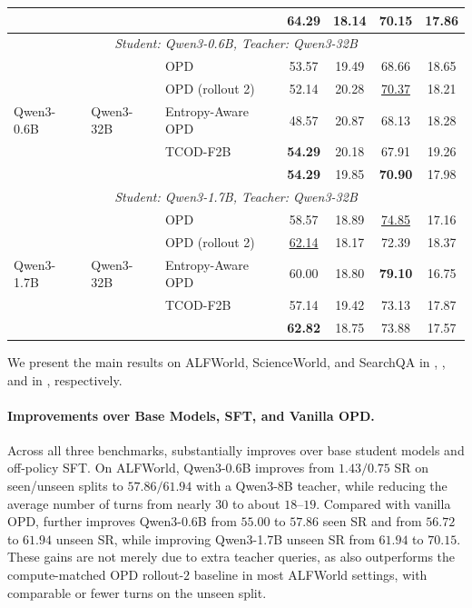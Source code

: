 \begin{table}[t]
{\begin{tabular}{lllcccc}
 & & \ours{} & \textbf{64.29} & 18.14 & \textbf{70.15} & 17.86 \\
\midrule
\multicolumn{7}{c}{\textit{Student: Qwen3-0.6B, Teacher: Qwen3-32B}} \\
\midrule
\multirow{5}{*}{Qwen3-0.6B} & \multirow{5}{*}{Qwen3-32B} & OPD & 53.57 & 19.49 & 68.66 & 18.65 \\
 & & OPD (rollout 2) & 52.14 & 20.28 & \underline{70.37} & 18.21 \\
 & & Entropy-Aware OPD & 48.57 & 20.87 & 68.13 & 18.28 \\
 & & TCOD-F2B & \textbf{54.29} & 20.18 & 67.91 & 19.26 \\
 & & \ours{} & \textbf{54.29} & 19.85 & \textbf{70.90} & 17.98 \\
\midrule
\multicolumn{7}{c}{\textit{Student: Qwen3-1.7B, Teacher: Qwen3-32B}} \\
\midrule
\multirow{5}{*}{Qwen3-1.7B} & \multirow{5}{*}{Qwen3-32B} & OPD & 58.57 & 18.89 & \underline{74.85} & 17.16 \\
 & & OPD (rollout 2) & \underline{62.14} & 18.17 & 72.39 & 18.37 \\
 & & Entropy-Aware OPD & 60.00 & 18.80 & \textbf{79.10} & 16.75 \\
 & & TCOD-F2B & 57.14 & 19.42 & 73.13 & 17.87 \\
 & & \ours{} & \textbf{62.82} & 18.75 & 73.88 & 17.57 \\
\bottomrule
\end{tabular}%
}
\end{table}

We present the main results on ALFWorld, ScienceWorld, and SearchQA in , , and  in , respectively.

\paragraph{Improvements over Base Models, SFT, and Vanilla OPD.}
Across all three benchmarks, \ours{} substantially improves over base student models and off-policy SFT. 
%
On ALFWorld, Qwen3-0.6B improves from $1.43/0.75$ SR on seen/unseen splits to $57.86/61.94$ with a Qwen3-8B teacher, while reducing the average number of turns from nearly $30$ to about $18$--$19$. 
%
Compared with vanilla OPD, \ours{} further improves Qwen3-0.6B from $55.00$ to $57.86$ seen SR and from $56.72$ to $61.94$ unseen SR, while improving Qwen3-1.7B unseen SR from $61.94$ to $70.15$. 
%
These gains are not merely due to extra teacher queries, as \ours{} also outperforms the compute-matched OPD rollout-$2$ baseline in most ALFWorld settings, with comparable or fewer turns on the unseen split.

